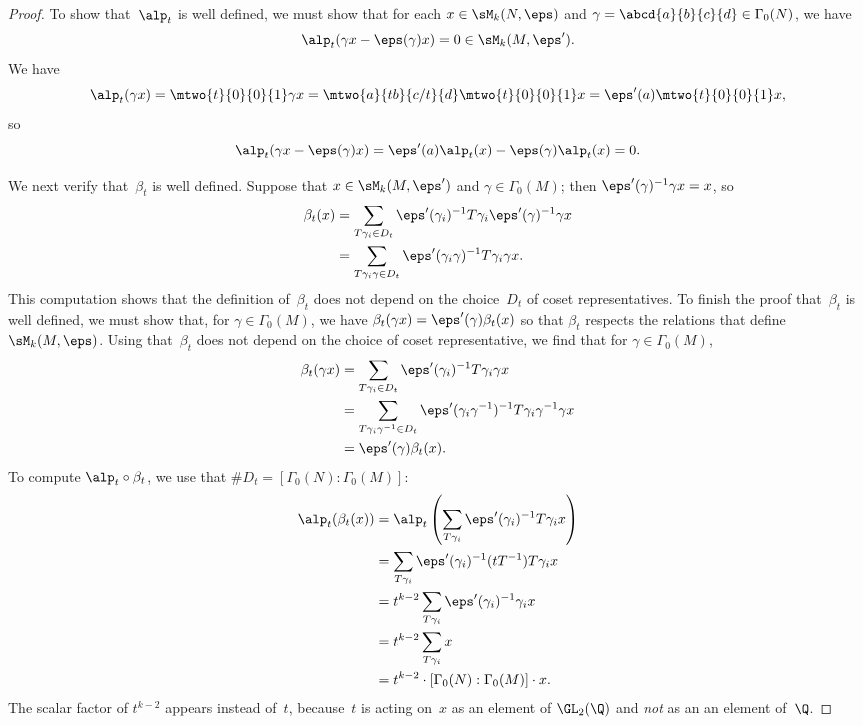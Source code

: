 \begin{proof}
To show that~$\alp_t$ is well defined, we must show that for
each $x\in\sM_k(N,\eps)$ and $\gamma=\abcd{a}{b}{c}{d}\in\Gamma_0(N)$, 
we have
  $$\alp_t(\gamma x  -\eps(\gamma) x)=0\in\sM_k(M,\eps').$$
We have
$$\alp_t(\gamma{}x) = \mtwo{t}{0}{0}{1}\gamma{}x
        = \mtwo{a}{tb}{c/t}{d}\mtwo{t}{0}{0}{1} x
        = \eps'(a)\mtwo{t}{0}{0}{1} x,$$
so 
$$\alp_t(\gamma x  -\eps(\gamma) x)
  = \eps'(a)\alp_t(x) - \eps(\gamma)\alp_t(x) = 0.$$

We next verify that~$\beta_t$ is well defined.
Suppose that $x\in\sM_k(M,\eps')$ and $\gamma\in\Gamma_0(M)$;
then $\eps'(\gamma)^{-1}\gamma{}x = x$, so
\begin{align*}
\beta_t(x) 
    &= \sum_{T\gamma_i\in D_t} 
        \eps'(\gamma_i)^{-1}T\gamma_i{}\eps'(\gamma)^{-1}\gamma{} x\\
    &= \sum_{T\gamma_i\gamma\in D_t} 
        \eps'(\gamma_i\gamma)^{-1}T\gamma_i{}\gamma{} x.
\end{align*}
This computation shows that the definition of~$\beta_t$ 
does not depend on the choice~$D_t$ of coset representatives.
To finish the proof that~$\beta_t$ is well defined,
we must show that, for $\gamma\in\Gamma_0(M)$, we have
$\beta_t(\gamma{}x) = \eps'(\gamma)\beta_t(x)$ so that $\beta_t$
respects the relations that define $\sM_k(M,\eps)$. 
Using that~$\beta_t$ does not depend on the choice of 
coset representative, we find that for $\gamma\in\Gamma_0(M)$,
\begin{align*}
  \beta_t(\gamma{}x) 
     &= \sum_{T\gamma_i\in D_t} \eps'(\gamma_i)^{-1}T\gamma_i{} \gamma{} x\\
     &= \sum_{T\gamma_i\gamma^{-1}\in D_t} 
         \eps'(\gamma_i\gamma^{-1})^{-1}T\gamma_i{}\gamma{}^{-1} \gamma{} x\\
     &= \eps'(\gamma)\beta_t(x).\\
\end{align*}
To compute $\alp_t\circ\beta_t$, we use 
that $\#D_t = [\Gamma_0(N) : \Gamma_0(M)]$:
\begin{align*}
 \alp_t(\beta_t(x)) &=
    \alp_t \left(\sum_{T\gamma_i}
        \eps'(\gamma_i)^{-1}T\gamma_i x\right)\\
  &= \sum_{T\gamma_i}
        \eps'(\gamma_i)^{-1}(tT^{-1})T\gamma_i x\\
  &= t^{k-2}\sum_{T\gamma_i}
        \eps'(\gamma_i)^{-1}\gamma_i x\\
  &= t^{k-2}\sum_{T\gamma_i} x \\
  &= t^{k-2} \cdot [\Gamma_0(N) : \Gamma_0(M)] \cdot x.
\end{align*}
The scalar factor of $t^{k-2}$ appears instead 
of~$t$, because~$t$ is acting on~$x$ as an element of $\GL_2(\Q)$
and {\em not} as an an element of~$\Q$.
\end{proof}

